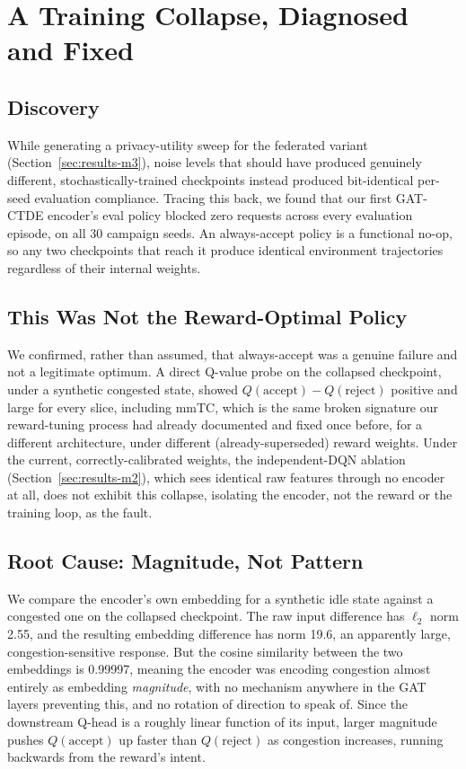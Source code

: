\documentclass[journal]{IEEEtran}
\begin{document}
\section{A Training Collapse, Diagnosed and Fixed}
\label{sec:collapse}

\subsection{Discovery}
While generating a privacy-utility sweep for the federated variant
(Section~\ref{sec:results-m3}), noise levels that should have produced
genuinely different, stochastically-trained checkpoints instead
produced bit-identical per-seed evaluation compliance. Tracing this
back, we found that our first GAT-CTDE encoder's eval policy blocked
zero requests across every evaluation episode, on all 30 campaign
seeds. An always-accept policy is a functional no-op, so any two
checkpoints that reach it produce identical environment trajectories
regardless of their internal weights.

\subsection{This Was Not the Reward-Optimal Policy}
We confirmed, rather than assumed, that always-accept was a genuine
failure and not a legitimate optimum. A direct Q-value probe on the
collapsed checkpoint, under a synthetic congested state, showed
$Q(\text{accept}) - Q(\text{reject})$ positive and large for every
slice, including mmTC, which is the same broken signature our reward-tuning
process had already documented and fixed once before, for a different
architecture, under different (already-superseded) reward weights.
Under the current, correctly-calibrated weights, the independent-DQN
ablation (Section~\ref{sec:results-m2}), which sees identical raw
features through no encoder at all, does not exhibit this collapse,
isolating the encoder, not the reward or the training loop, as the
fault.

\subsection{Root Cause: Magnitude, Not Pattern}
We compare the encoder's own embedding for a synthetic idle state
against a congested one on the collapsed checkpoint. The raw input
difference has $\ell_2$ norm 2.55, and the resulting embedding
difference has norm 19.6, an apparently large, congestion-sensitive
response. But the cosine similarity between the two embeddings is
0.99997, meaning the encoder was encoding congestion almost entirely as
embedding \emph{magnitude}, with no mechanism anywhere in the GAT
layers preventing this, and no rotation of direction to speak of.
Since the downstream Q-head is a roughly linear function of its input,
larger magnitude pushes $Q(\text{accept})$ up faster than
$Q(\text{reject})$ as congestion increases, running backwards from the
reward's intent.
\end{document}
